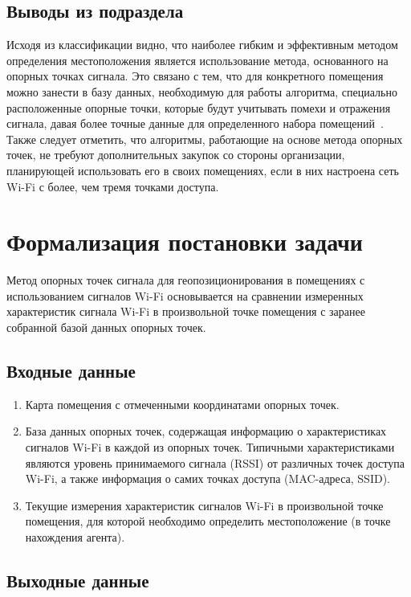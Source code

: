 \subsection*{Выводы из подраздела}

Исходя из классификации видно, что наиболее гибким и эффективным методом определения местоположения является использование метода, основанного на опорных точках сигнала. Это связано с тем, что для конкретного помещения можно занести в базу данных, необходимую для работы алгоритма, специально расположенные опорные точки, которые будут учитывать помехи и отражения сигнала, давая более точные данные для определенного набора помещений~\cite{bag}. Также следует отметить, что алгоритмы, работающие на основе метода опорных точек, не требуют дополнительных закупок со стороны организации, планирующей использовать его в своих помещениях, если в них настроена сеть Wi-Fi с более, чем тремя точками доступа.

\section{Формализация постановки задачи}

Метод опорных точек сигнала для геопозиционирования в помещениях с использованием сигналов Wi-Fi основывается на сравнении измеренных характеристик сигнала Wi-Fi в произвольной точке помещения с заранее собранной базой данных опорных точек.

\subsection*{Входные данные}

\begin{enumerate}
    \item Карта помещения с отмеченными координатами опорных точек.
    \item База данных опорных точек, содержащая информацию о характеристиках сигналов Wi-Fi в каждой из опорных точек. Типичными характеристиками являются уровень принимаемого сигнала (RSSI) от различных точек доступа Wi-Fi, а также информация о самих точках доступа (MAC-адреса, SSID).
    \item Текущие измерения характеристик сигналов Wi-Fi в произвольной точке помещения, для которой необходимо определить местоположение (в точке нахождения агента).
\end{enumerate}

\subsection*{Выходные данные}

